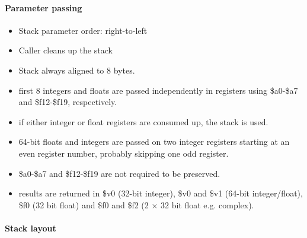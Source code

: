 \paragraph{Parameter passing}

\begin{itemize}
\item Stack parameter order: right-to-left
\item Caller cleans up the stack
\item Stack always aligned to 8 bytes.
\item first 8 integers and floats are passed independently in registers using \$a0-\$a7 and \$f12-\$f19, respectively.
\item if either integer or float registers are consumed up, the stack is used.
\item 64-bit floats and integers are passed on two integer registers starting at an even register number, probably skipping one odd register.
\item \$a0-\$a7 and \$f12-\$f19 are not required to be preserved.
\item results are returned in \$v0 (32-bit integer), \$v0 and \$v1 (64-bit integer/float), \$f0 (32 bit float) and \$f0 and \$f2 (2 $\times$ 32 bit float e.g. complex).
\end{itemize}

\paragraph{Stack layout}

